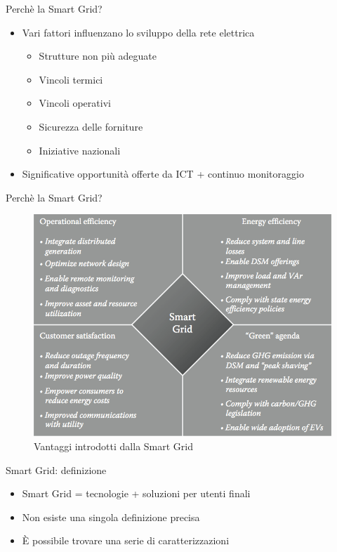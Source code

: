 \begin{frame}{Perchè la Smart Grid?}
	\begin{itemize}[<+- | alert@+>]
	\item Vari fattori influenzano lo sviluppo della rete elettrica
	 \begin{itemize}
	  	\item Strutture non più adeguate
	  	\item Vincoli termici
	  	\item Vincoli operativi
	  	\item Sicurezza delle forniture
	  	\item Iniziative nazionali
	 \end{itemize}
	\item Significative opportunità offerte da ICT + continuo monitoraggio
	\end{itemize}
\end{frame}


\begin{frame}{Perchè la Smart Grid?}
	\begin{figure}[h] 
		\includegraphics[scale=0.25]{imgs/benefits.png}
		\caption{Vantaggi introdotti dalla Smart Grid}
	\end{figure}
\end{frame}


\begin{frame}{Smart Grid: definizione}
\begin{itemize}[<+- | alert@+>]
\item Smart Grid = tecnologie + soluzioni per utenti finali
\item Non esiste una singola definizione precisa
\item È possibile trovare una serie di caratterizzazioni
\end{itemize}
\end{frame}

